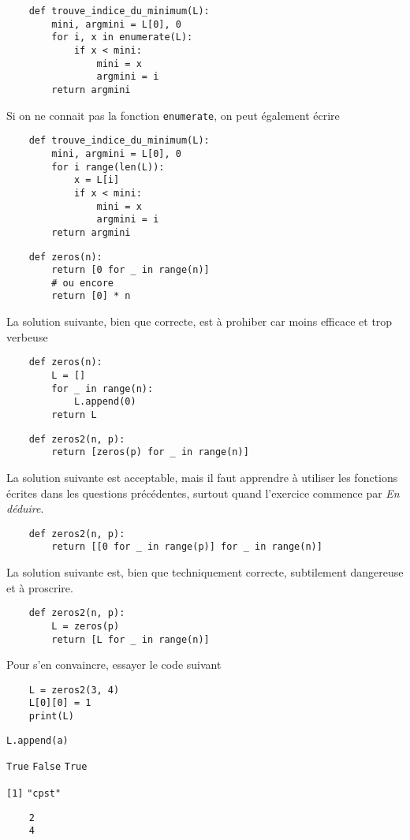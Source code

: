 \ssques \begin{verbatim}
    def trouve_indice_du_minimum(L):
        mini, argmini = L[0], 0
        for i, x in enumerate(L):
            if x < mini:
                mini = x
                argmini = i
        return argmini
\end{verbatim}

Si on ne connait pas la fonction \texttt{enumerate}, on peut également écrire
\begin{verbatim}
    def trouve_indice_du_minimum(L):
        mini, argmini = L[0], 0
        for i range(len(L)):
            x = L[i]
            if x < mini:
                mini = x
                argmini = i
        return argmini
\end{verbatim}

\quessques \begin{verbatim}
    def zeros(n):
        return [0 for _ in range(n)]
        # ou encore
        return [0] * n
\end{verbatim}

La solution suivante, bien que correcte, est à prohiber car moins efficace et trop verbeuse
\begin{verbatim}
    def zeros(n):
        L = []
        for _ in range(n):
            L.append(0)
        return L
\end{verbatim}


\ssques \begin{verbatim}
    def zeros2(n, p):
        return [zeros(p) for _ in range(n)]
\end{verbatim}

La solution suivante est acceptable, mais il faut apprendre à utiliser les fonctions écrites dans les questions précédentes, surtout quand l'exercice commence par \textit{En déduire}.
\begin{verbatim}
    def zeros2(n, p):
        return [[0 for _ in range(p)] for _ in range(n)]
\end{verbatim}

La solution suivante est, bien que techniquement correcte, subtilement dangereuse et à proscrire. 

\begin{verbatim}
    def zeros2(n, p):
        L = zeros(p)
        return [L for _ in range(n)]
\end{verbatim}

Pour s'en convaincre, essayer le code suivant 

\begin{verbatim}
    L = zeros2(3, 4)
    L[0][0] = 1
    print(L)
\end{verbatim}

\ques \texttt{L.append(a)}

\quessques \texttt{True}
\ssques \texttt{False}
\ssques \texttt{True}

\quessques \texttt{[1]}
\ssques \texttt{"cpst"}
\ssques \begin{verbatim}
    2
    4
\end{verbatim}
